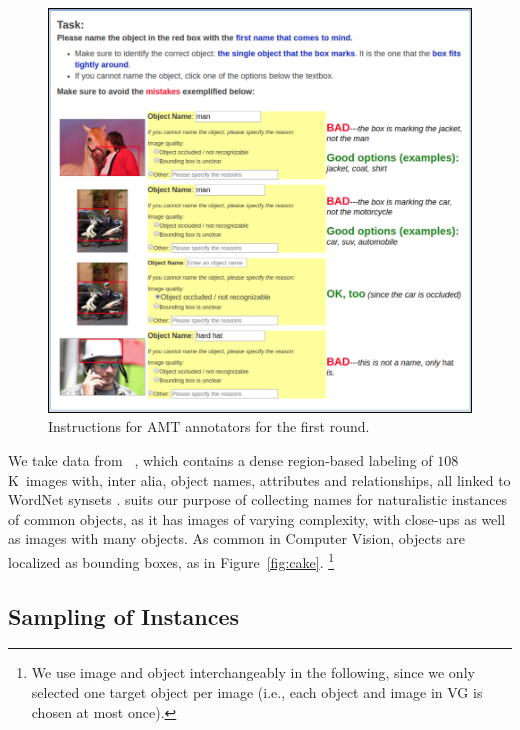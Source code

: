 \begin{figure}[htp]
  \centering
  \includegraphics[width=1.5\columnwidth]{figures/round0.png}
  \caption{Instructions for AMT annotators for the first round.}
  \label{fig:instructions1}
\end{figure}

We take data from \vgenome~\cite{krishna2016visualgenome}, which
contains a dense region-based labeling of $108$K~images with, inter alia, object names, attributes and relationships,
all linked to WordNet synsets \cite{fellbaum1998wordnet}.
\vg suits our purpose of collecting names for naturalistic instances of common objects, as it has images of varying complexity, with close-ups as well as images with many objects.
As common in Computer Vision, objects are localized as bounding boxes, as in Figure~\ref{fig:cake}.%
\footnote{We use image and object interchangeably in the following, since we only selected one target object per image (i.e., each object and image in VG is chosen at most once).}

\subsection{Sampling of Instances}
\label{ssec:sampling}

